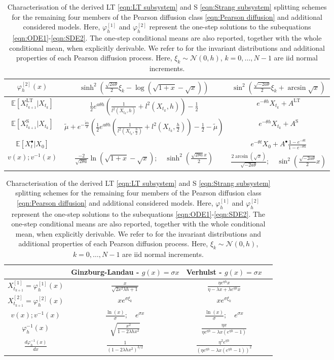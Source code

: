 \documentclass[a4paper,12pt]{article}
\numberwithin{equation}{section}
\theoremstyle{plain}
\theoremstyle{definition}
\begin{document}
\begin{appendix}
\begin{table}
\begin{tabular}{ccc}
$\varphi^{[2]}_{h}(x)$& $\sinh^2\left(\frac{\sqrt{2a\theta}}{2}{\xi_k}-\log(\sqrt{1+x}-\sqrt{x})\right)$&$\sin^2\left(\frac{\sqrt{-2a\theta}}{2}\xi_k+\arcsin\sqrt{x}\right)$\\ \midrule
$\mathbb{E}[X^{\textrm{LT}}_{t_{k+1}}|X_{t_k}]$& $\frac{1}{2}e^{a\theta h}\left(\frac{1}{l^2(X_{t_k},h)}+l^2(X_{t_k},h)\right)-\frac{1}{2}$&$e^{-\theta h}X_{t_k}+A^{\textrm{LT}}$\\ \midrule
$\mathbb{E}[X^{\textrm{S}}_{t_{k+1}}|X_{t_k}]$& $\tilde{\mu}+e^{-\frac{\tilde{\theta}h}{2}}\left(\frac{1}{2}e^{a\theta h}\left(\frac{1}{l^2(X_{t_k},\frac{h}{2})}+l^2(X_{t_k},\frac{h}{2})\right)-\frac{1}{2}-\tilde{\mu}\right)$&$e^{-\theta h}X_{t_k}+ A^{\textrm{S}}$\\ \midrule
$\mathbb{E}[X^{\bullet}_{t}|X_{0}]$&& $e^{-\theta t}X_0+A^{\bullet}\frac{1-e^{-\theta t}}{1-e^{-\theta h}}$ \\ \midrule
$v(x); v^{-1}(x)$&$\frac{-2}{\sqrt{2\theta a}}\ln(\sqrt{1+x}-\sqrt{x});\quad \sinh^2(\frac{\sqrt{2\theta a}x}{2})$&$\frac{2\arcsin (\sqrt{x})}{\sqrt{-2a\theta}};\quad \sin^2\left(\frac{\sqrt{-2a\theta}}{2}x\right)$\\ 
        \bottomrule
        \end{tabular}
    \vspace{.5cm}
        \begin{tabular}{cccc}
        \toprule
    & {\bf Ginzburg-Landau} - $g(x)= \sigma x$& {\bf Verhulst} - $g(x)=\sigma x$\\ \midrule
$X^{[1]}_{t_{k+1}}=\varphi^{[1]}_h(x)$&$\frac{x}{\sqrt{2x^2\lambda h+1}}$&$\frac{\eta e^{\eta h} x}{\eta-\lambda x+\lambda e^{\eta h} x}$\\ \midrule
$X^{[2]}_{t_{k+1}}=\varphi_h^{[2]}(x)$&$xe^{\sigma \xi_k}$&$xe^{\sigma \xi_k}$\\ \midrule
    $v(x); v^{-1}(x)$&$\frac{\ln(x)}{\sigma}; \quad e^{\sigma x}$& $\frac{\ln(x)}{\sigma};\quad e^{\sigma x}$\\ \midrule  
    $\varphi^{-1}_h(x)$&$\sqrt{\frac{x^2}{1-2\lambda hx^2}}$& $\frac{\eta x}{\eta e^{\eta h}-\lambda x\left(e^{\eta h}-1\right)}$\\ \midrule
    $\frac{d\varphi^{-1}_h(x)}{dx}$&$\frac{1}{\left(1-2\lambda h x^2\right)^{3/2}}$&$\frac{\eta^2 e^{\eta h}}{\left(\eta e^{\eta h}-\lambda x\left(e^{\eta h}-1\right)\right)^2}$\\ \midrule
    \bottomrule
    \end{tabular}    \caption{
 Characterisation of the derived LT  \eqref{eqn:LT subsystem} and S \eqref{eqn:Strang subsystem} splitting schemes for the remaining four members of the Pearson diffusion class \eqref{eqn:Pearson diffusion} and additional considered models. Here, $\varphi^{[1]}_h$ and $\varphi^{[2]}_h$ represent the one-step solutions to the subequations \eqref{eqn:ODE1}-\eqref{eqn:SDE2}. The one-step conditional means are also reported, together with the whole conditional mean, when explicitly derivable. We refer to \cite{forman_pearson_2008} for the invariant distributions and additional properties of each Pearson diffusion process. Here, $\xi_k\sim \mathcal{N}(0,h)$, $k=0,\ldots, N-1$ are iid normal increments.}

\end{table}
\end{appendix}
\end{document}
